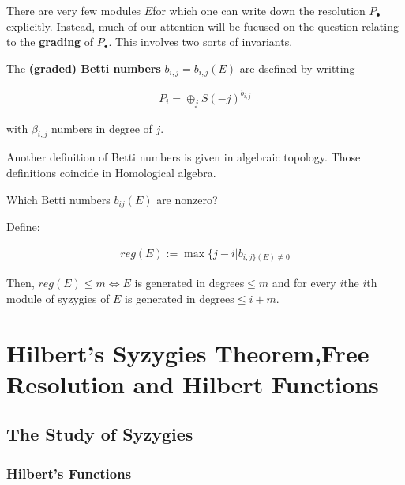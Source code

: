 \documentclass[Total.tex]{subfiles}
\begin{document}
			There are very few modules $E$for which one can write down the resolution $P_\bullet$ explicitly. Instead, much of our attention will be fucused on the question relating to the \textbf{grading} of $P_\bullet$. This involves two sorts of invariants. 
			
			\begin{Def}
				The \textbf{(graded) Betti numbers} $b_{i,j}=b_{i,j}(E)$ are dsefined by writting
				
				\begin{gather*}
					P_i=\oplus_j S(-j)^{b_{i,j}}
				\end{gather*}
				
				with $\beta_{i,j}$ numbers in degree of $j$. 
			\end{Def}
			
			Another definition of Betti numbers is given in algebraic topology. Those definitions coincide in Homological algebra.
			
			\begin{prob}
				Which Betti numbers $b_{ij}(E)$ are nonzero?
			\end{prob}
			
			\begin{Def}
				Define:
				
				\begin{gather*}
					reg(E):=\max\{j-i|b_{i,j\}(E)\not=0}
				\end{gather*}
				
				Then, $reg(E)\leq m\Leftrightarrow E$ is generated in degrees$\leq m$ and for every $i$the $i$th module of syzygies of $E$ is generated in degrees$\leq i+m$.
			\end{Def}
	\chapter{Hilbert's Syzygies Theorem,Free Resolution and Hilbert Functions}
	
		\section{The Study of Syzygies}
		
		\subsection{Hilbert's Functions}
		
\end{document}
